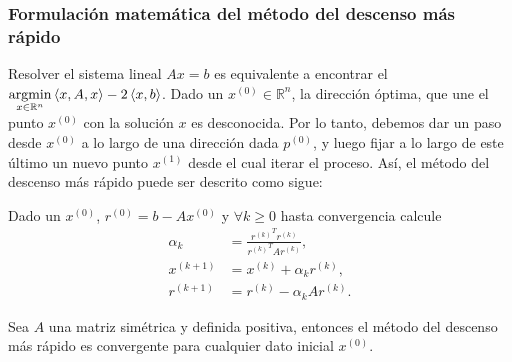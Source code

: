 \begin{frame}
	\frametitle{Formulación matemática del método del descenso más rápido}
	Resolver el sistema lineal $Ax=b$ es equivalente a encontrar el
	\begin{math}
		\operatornamewithlimits{argmin}\limits_{x\in\mathbb{R}^{n}}
		\left\langle x,A,x\right\rangle-
		2\left\langle x,b\right\rangle
	\end{math}.
	Dado un $x^{\left(0\right)}\in\mathbb{R}^{n}$, la
	\alert{dirección óptima}, que une el punto $x^{\left(0\right)}$ con
	la solución $x$ es desconocida.
	Por lo tanto, debemos dar un paso desde $x^{\left(0\right)}$ a lo
	largo de una dirección dada $p^{\left(0\right)}$, y luego fijar a
	lo largo de este último un nuevo punto $x^{\left(1\right)}$ desde
	el cual iterar el proceso.
	Así, el \alert{método del descenso más rápido} puede ser descrito
	como sigue:

	Dado un $x^{\left(0\right)}$,
	$r^{\left(0\right)}=b-Ax^{\left(0\right)}$ y $\forall k\geq0$ hasta
	convergencia calcule
	\begin{align*}
		\alpha_{k}
		                     & =
		\frac{
		{r^{\left(k\right)}}^{T}r^{\left(k\right)}
		}{
		{r^{\left(k\right)}}^{T}Ar^{\left(k\right)}
		},                            \\
		x^{\left(k+1\right)} & =
		x^{\left(k\right)}+
		\alpha_{k}r^{\left(k\right)}, \\
		r^{\left(k+1\right)} & =
		r^{\left(k\right)}-
		\alpha_{k}Ar^{\left(k\right)}.
	\end{align*}

	\begin{theorem}
		Sea $A$ una matriz simétrica y definida positiva, entonces el
		\alert{método del descenso más rápido} es convergente para
		cualquier dato inicial $x^{\left(0\right)}$.
	\end{theorem}
\end{frame}


